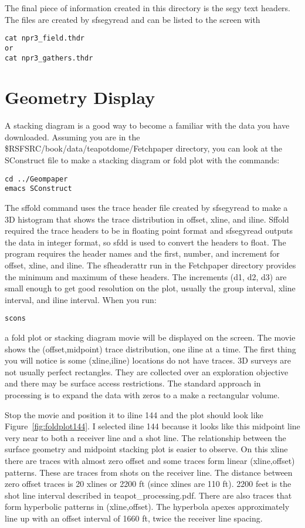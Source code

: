 The final piece of information created in this directory is the segy text headers.   The files are created by sfsegyread and can be listed to the screen with 
\begin{verbatim}
cat npr3_field.thdr 
or 
cat npr3_gathers.thdr  
\end{verbatim}

\section{Geometry Display}
A stacking diagram is a good way to become a familiar with the data you have downloaded.  Assuming you are in the \$RSFSRC/book/data/teapotdome/Fetchpaper directory, you can look at the SConstruct file to make a stacking diagram or fold plot with the commands:
\begin{verbatim}  
cd ../Geompaper
emacs SConstruct
\end{verbatim}  
 
The sffold command uses the trace header file created by sfsegyread to make a 3D histogram that shows the trace distribution in offset, xline, and iline.  Sffold required the trace headers to be in floating point format and sfsegyread outputs the data in integer format, so sfdd is used to convert the headers to float.  The program requires the header names and the first, number, and increment for offset, xline, and iline.  The sfheaderattr run in the Fetchpaper directory provides the minimum and maximum of these headers.  The increments (d1, d2, d3) are small enough to get good resolution on the plot, usually the group interval, xline interval, and iline interval.  When you run:
\begin{verbatim}  
scons
\end{verbatim}  

a fold plot or stacking diagram movie will be displayed on the screen.  The movie shows the (offset,midpoint) trace distribution, one iline at a time. The first thing you will notice is some (xline,iline) locations do not have traces.  3D surveys are not usually perfect rectangles.  They are collected over an exploration objective and there may be surface access restrictions.  The standard approach in processing is to expand the data with zeros to a make a rectangular volume.

Stop the movie and position it to iline 144 and the plot should look like Figure~\ref{fig:foldplot144}.  I selected iline 144 because it looks like this midpoint line very near to both a receiver line and a shot line.   The relationship between the surface geometry and midpoint stacking plot is easier to observe.  On this xline there are traces with almost zero offset and some traces form linear (xline,offset) patterns.  These are traces from shots on the receiver line.  The distance between zero offset traces is 20 xlines or 2200 ft (since xlines are 110 ft).  2200 feet is the shot line interval described in teapot\_processing.pdf.  There are also traces that form hyperbolic patterns in (xline,offset).  The hyperbola apexes approximately line up with an offset interval of 1660 ft, twice the receiver line spacing.

